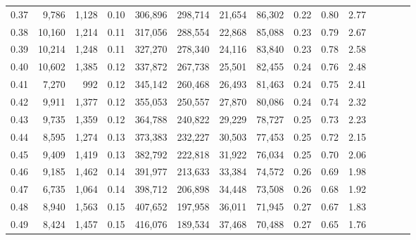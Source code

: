 \begin{tabular}{rrrcrrrrrrrrrrr}
0.37 &   9,786 &  1,128 &                                       0.10 &  306,896 &  298,714 &   21,654 &   86,302 &  0.22 &  0.80 &                         2.77 \\
0.38 &  10,160 &  1,214 &                                       0.11 &  317,056 &  288,554 &   22,868 &   85,088 &  0.23 &  0.79 &                         2.67 \\
0.39 &  10,214 &  1,248 &                                       0.11 &  327,270 &  278,340 &   24,116 &   83,840 &  0.23 &  0.78 &                         2.58 \\
0.40 &  10,602 &  1,385 &                                       0.12 &  337,872 &  267,738 &   25,501 &   82,455 &  0.24 &  0.76 &                         2.48 \\
0.41 &   7,270 &    992 &                                       0.12 &  345,142 &  260,468 &   26,493 &   81,463 &  0.24 &  0.75 &                         2.41 \\
0.42 &   9,911 &  1,377 &                                       0.12 &  355,053 &  250,557 &   27,870 &   80,086 &  0.24 &  0.74 &                         2.32 \\
0.43 &   9,735 &  1,359 &                                       0.12 &  364,788 &  240,822 &   29,229 &   78,727 &  0.25 &  0.73 &                         2.23 \\
0.44 &   8,595 &  1,274 &                                       0.13 &  373,383 &  232,227 &   30,503 &   77,453 &  0.25 &  0.72 &                         2.15 \\
0.45 &   9,409 &  1,419 &                                       0.13 &  382,792 &  222,818 &   31,922 &   76,034 &  0.25 &  0.70 &                         2.06 \\
0.46 &   9,185 &  1,462 &                                       0.14 &  391,977 &  213,633 &   33,384 &   74,572 &  0.26 &  0.69 &                         1.98 \\
0.47 &   6,735 &  1,064 &                                       0.14 &  398,712 &  206,898 &   34,448 &   73,508 &  0.26 &  0.68 &                         1.92 \\
0.48 &   8,940 &  1,563 &                                       0.15 &  407,652 &  197,958 &   36,011 &   71,945 &  0.27 &  0.67 &                         1.83 \\
0.49 &   8,424 &  1,457 &                                       0.15 &  416,076 &  189,534 &   37,468 &   70,488 &  0.27 &  0.65 &                         1.76 \\

\end{tabular}
